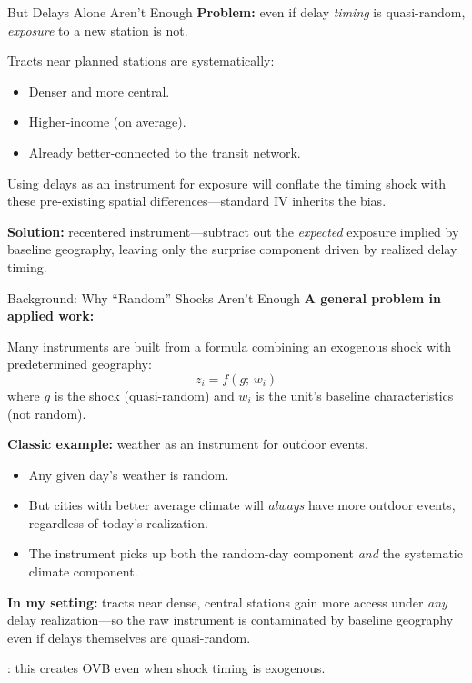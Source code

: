 \documentclass{beamer}
\begin{document}
\begin{frame}{But Delays Alone Aren't Enough}
\small
\textbf{Problem:} even if delay \emph{timing} is quasi-random, \emph{exposure} to a new
station is not.

\medskip
Tracts near planned stations are systematically:
\begin{itemize}
    \item Denser and more central.
    \item Higher-income (on average).
    \item Already better-connected to the transit network.
\end{itemize}

\medskip
Using delays as an instrument for exposure will conflate the timing shock with these
pre-existing spatial differences---standard IV inherits the bias.

\medskip
\textbf{Solution:} \textcite{borusyak_nonrandom_2023} recentered instrument---subtract out
the \emph{expected} exposure implied by baseline geography, leaving only the surprise
component driven by realized delay timing.
\end{frame}

\begin{frame}{Background: Why ``Random'' Shocks Aren't Enough}
\small
\textbf{A general problem in applied work:}

Many instruments are built from a formula combining an exogenous shock with
predetermined geography:
\[
    z_i = f(g;\, w_i)
\]
where $g$ is the shock (quasi-random) and $w_i$ is the unit's baseline characteristics (not random).

\medskip
\textbf{Classic example:} weather as an instrument for outdoor events.
\begin{itemize}
    \item Any given day's weather is random.
    \item But cities with better average climate will \emph{always} have more outdoor events,
          regardless of today's realization.
    \item The instrument picks up both the random-day component \emph{and} the
          systematic climate component.
\end{itemize}

\medskip
\textbf{In my setting:} tracts near dense, central stations gain more access under
\emph{any} delay realization---so the raw instrument is contaminated by baseline
geography even if delays themselves are quasi-random.

\medskip
\citeauthor{borusyak_nonrandom_2023}: this creates OVB even when shock timing is exogenous.
\end{frame}
\end{document}
